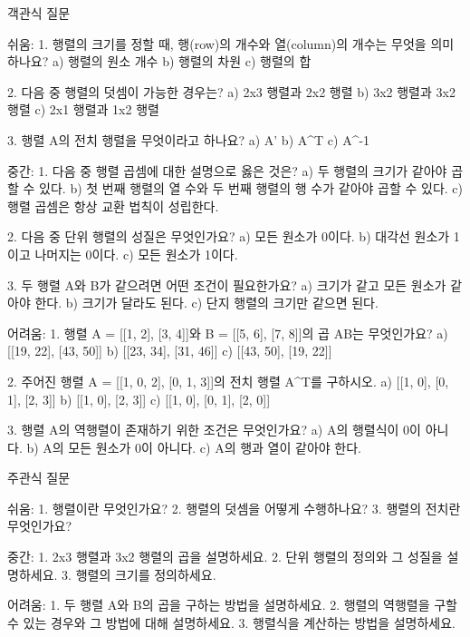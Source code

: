 \documentclass[fleqn]{article}
\begin{document}
      
       객관식 질문

쉬움:
1. 행렬의 크기를 정할 때, 행(row)의 개수와 열(column)의 개수는 무엇을 의미하나요?  
   a) 행렬의 원소 개수  
   b) 행렬의 차원  
   c) 행렬의 합  

2. 다음 중 행렬의 덧셈이 가능한 경우는?  
   a) 2x3 행렬과 2x2 행렬  
   b) 3x2 행렬과 3x2 행렬  
   c) 2x1 행렬과 1x2 행렬  

3. 행렬 A의 전치 행렬을 무엇이라고 하나요?  
   a) A’  
   b) A^T  
   c) A^-1  

중간:
1. 다음 중 행렬 곱셈에 대한 설명으로 옳은 것은?  
   a) 두 행렬의 크기가 같아야 곱할 수 있다.  
   b) 첫 번째 행렬의 열 수와 두 번째 행렬의 행 수가 같아야 곱할 수 있다.  
   c) 행렬 곱셈은 항상 교환 법칙이 성립한다.  

2. 다음 중 단위 행렬의 성질은 무엇인가요?  
   a) 모든 원소가 0이다.  
   b) 대각선 원소가 1이고 나머지는 0이다.  
   c) 모든 원소가 1이다.  

3. 두 행렬 A와 B가 같으려면 어떤 조건이 필요한가요?  
   a) 크기가 같고 모든 원소가 같아야 한다.  
   b) 크기가 달라도 된다.  
   c) 단지 행렬의 크기만 같으면 된다.  

어려움:
1. 행렬 A = [[1, 2], [3, 4]]와 B = [[5, 6], [7, 8]]의 곱 AB는 무엇인가요?  
   a) [[19, 22], [43, 50]]  
   b) [[23, 34], [31, 46]]  
   c) [[43, 50], [19, 22]]  

2. 주어진 행렬 A = [[1, 0, 2], [0, 1, 3]]의 전치 행렬 A^T를 구하시오.  
   a) [[1, 0], [0, 1], [2, 3]]  
   b) [[1, 0], [2, 3]]  
   c) [[1, 0], [0, 1], [2, 0]]  

3. 행렬 A의 역행렬이 존재하기 위한 조건은 무엇인가요?  
   a) A의 행렬식이 0이 아니다.  
   b) A의 모든 원소가 0이 아니다.  
   c) A의 행과 열이 같아야 한다.  

 주관식 질문

쉬움:  
1. 행렬이란 무엇인가요?  
2. 행렬의 덧셈을 어떻게 수행하나요?  
3. 행렬의 전치란 무엇인가요?  

중간:  
1. 2x3 행렬과 3x2 행렬의 곱을 설명하세요.  
2. 단위 행렬의 정의와 그 성질을 설명하세요.  
3. 행렬의 크기를 정의하세요.  
   
어려움:  
1. 두 행렬 A와 B의 곱을 구하는 방법을 설명하세요.  
2. 행렬의 역행렬을 구할 수 있는 경우와 그 방법에 대해 설명하세요.  
3. 행렬식을 계산하는 방법을 설명하세요.  

      
      
\end{document}
